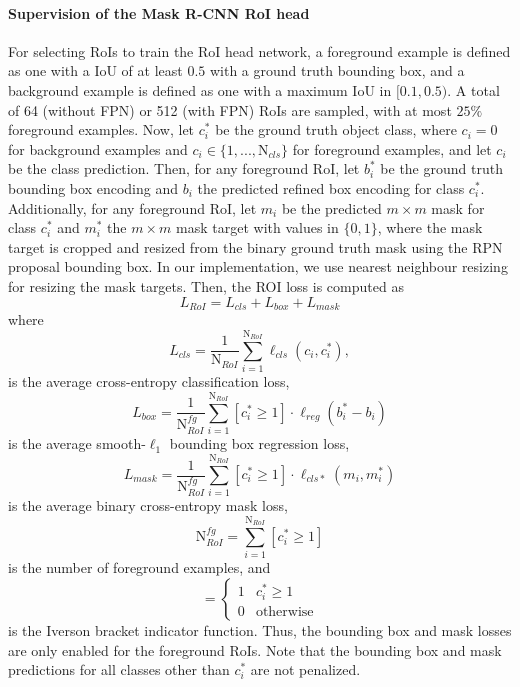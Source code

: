 \paragraph{Supervision of the Mask R-CNN RoI head}
For selecting RoIs to train the RoI head network, a foreground example
is defined as one with a IoU of at least $0.5$ with
a ground truth bounding box, and a background example is defined as
one with a maximum IoU in $[0.1, 0.5)$.
A total of 64 (without FPN) or 512 (with FPN) RoIs are sampled, with
at most $25\%$ foreground examples.
Now, let $c_i^*$ be the ground truth object class, where $c_i = 0$
for background examples and $c_i \in \{1, ..., \text{N}_{cls}\}$ for foreground examples,
and let $c_i$ be the class prediction.
Then, for any foreground RoI, let $b_i^*$ be the ground truth bounding box encoding and $b_i$
the predicted refined box encoding for class $c_i^*$.
Additionally, for any foreground RoI, let $m_i$ be the predicted $m \times m$ mask for class $c_i^*$
and $m_i^*$ the $m \times m$ mask target with values in $\{0,1\}$, where the mask target is cropped and resized from
the binary ground truth mask using the RPN proposal bounding box.
In our implementation, we use nearest neighbour resizing for resizing the mask
targets.
Then, the ROI loss is computed as
\begin{equation}
L_{RoI} = L_{cls} + L_{box} + L_{mask}
\end{equation}
where
\begin{equation}
L_{cls} = \frac{1}{\text{N}_{RoI}} \sum_{i=1}^{\text{N}_{RoI}} \ell_{cls}(c_i, c_i^*),
\end{equation}
is the average cross-entropy classification loss,
\begin{equation}
L_{box} = \frac{1}{\text{N}_{RoI}^{\mathit{fg}}} \sum_{i=1}^{\text{N}_{RoI}} [c_i^* \geq 1] \cdot \ell_{reg}(b_i^* - b_i)
\end{equation}
is the average smooth-$\ell_1$ bounding box regression loss,
\begin{equation}
L_{mask} = \frac{1}{\text{N}_{RoI}^{\mathit{fg}}} \sum_{i=1}^{\text{N}_{RoI}} [c_i^* \geq 1] \cdot \ell_{cls*}(m_i,m_i^*)
\end{equation}
is the average binary cross-entropy mask loss,
\begin{equation}
\text{N}_{RoI}^{\mathit{fg}} = \sum_{i=1}^{\text{N}_{RoI}} [c_i^* \geq 1]
\end{equation}
is the number of foreground examples, and
\begin{equation}
[c_i^* \geq 1] =
\begin{cases}
1 &\text{$c_i^* \geq 1$} \\
0 &\text{otherwise}
\end{cases}
\end{equation}
is the Iverson bracket indicator function. Thus, the bounding box and mask
losses are only enabled for the foreground RoIs. Note that the bounding box and mask predictions
for all classes other than $c_i^*$ are not penalized.

